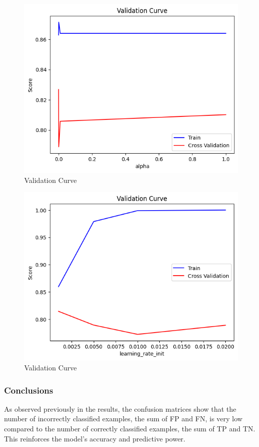 \begin{figure}[H]
    \centering
    \includegraphics[width=0.75\linewidth]{images/ValidationCurveMLP_alpha.png}
    \caption{Validation Curve}
    \label{fig:ValidationCurveMLP_alpha}
\end{figure}
\begin{figure}[H]
    \centering
    \includegraphics[width=0.75\linewidth]{images/ValidationCurveMLP_learning.png}
    \caption{Validation Curve}
    \label{fig:ValidationCurveGamma_SVC}
\end{figure}

\subsubsection{Conclusions}
As observed previously in the results, the confusion matrices show that the number of incorrectly classified examples, the sum of FP and FN, is very low compared to the number of correctly classified examples, the sum of TP and TN. This reinforces the model's accuracy and predictive power.

